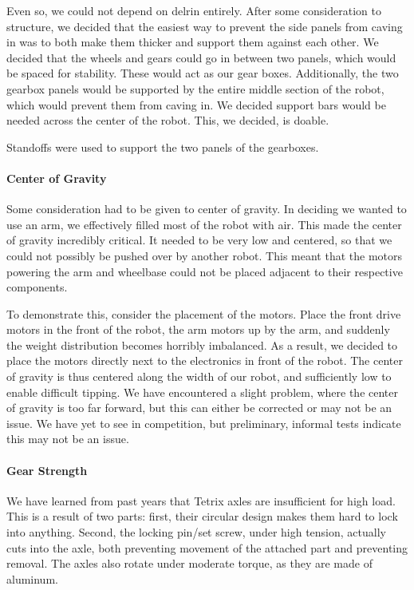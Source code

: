 \documentclass{article}
\begin{document}
Even so, we could not depend on delrin entirely. After some consideration to structure, we decided that the easiest way to prevent the side panels from caving in was to both make them thicker and support them against each other. We decided that the wheels and gears could go in between two panels, which would be spaced for stability. These would act as our gear boxes. Additionally, the two gearbox panels would be supported by the entire middle section of the robot, which would prevent them from caving in. We decided support bars would be needed across the center of the robot. This, we decided, is doable.

Standoffs were used to support the two panels of the gearboxes.

\paragraph{Center of Gravity} Some consideration had to be given to center of gravity. In deciding we wanted to use an arm, we effectively filled most of the robot with air. This made the center of gravity incredibly critical. It needed to be very low and centered, so that we could not possibly be pushed over by another robot. This meant that the motors powering the arm and wheelbase could not be placed adjacent to their respective components. 

To demonstrate this, consider the placement of the motors. Place the front drive motors in the front of the robot, the arm motors up by the arm, and suddenly the weight distribution becomes horribly imbalanced. As a result, we decided to place the motors directly next to the electronics in front of the robot. The center of gravity is thus centered along the width of our robot, and sufficiently low to enable difficult tipping. We have encountered a slight problem, where the center of gravity is too far forward, but this can either be corrected or may not be an issue. We have yet to see in competition, but preliminary, informal tests indicate this may not be an issue. 

\paragraph{Gear Strength} We have learned from past years that Tetrix axles are insufficient for high load. This is a result of two parts: first, their circular design makes them hard to lock into anything. Second, the locking pin/set screw, under high tension, actually cuts into the axle, both preventing movement of the attached part and preventing removal. The axles also rotate under moderate torque, as they are made of aluminum.
\end{document}

